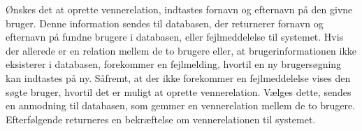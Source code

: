 
\noindent
Ønskes det at oprette vennerelation, indtastes fornavn og efternavn på den givne bruger. Denne information sendes til databasen, der returnerer fornavn og efternavn på fundne brugere i databasen, eller fejlmeddelelse til systemet. Hvis der allerede er en relation mellem de to brugere eller, at brugerinformationen ikke eksisterer i databasen, forekommer en fejlmelding, hvortil en ny brugersøgning kan indtastes på ny. 
Såfremt, at der ikke forekommer en fejlmeddelelse vises den søgte bruger, hvortil det er muligt at oprette vennerelation. 
Vælges dette, sendes en anmodning til databasen, som gemmer en vennerelation mellem de to brugere. Efterfølgende returneres en bekræftelse om vennerelationen til systemet.